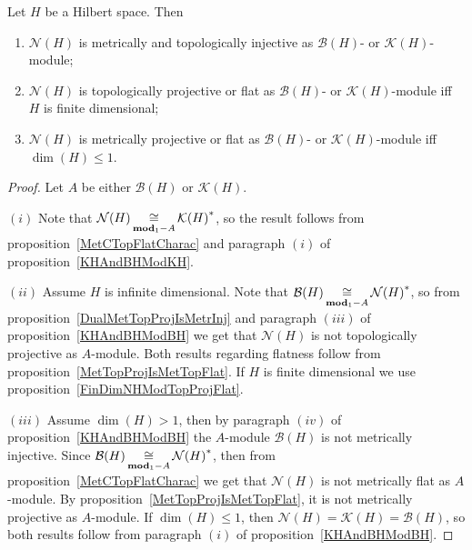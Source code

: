 \begin{proposition}\label{KHAndBHModNH} Let $H$ be a Hilbert space. Then

\begin{enumerate}[label = (\roman*)]
    \item $\mathcal{N}(H)$ is metrically and topologically injective as
    $\mathcal{B}(H)$- or $\mathcal{K}(H)$-module;

    \item $\mathcal{N}(H)$ is topologically projective or flat 
    as $\mathcal{B}(H)$- or $\mathcal{K}(H)$-module 
    iff $H$ is finite dimensional;

    \item $\mathcal{N}(H)$ is metrically projective or flat 
    as $\mathcal{B}(H)$- or $\mathcal{K}(H)$-module iff $\dim(H)\leq 1$.
\end{enumerate}
\end{proposition}
\begin{proof} Let $A$ be either $\mathcal{B}(H)$ or $\mathcal{K}(H)$.

$(i)$ Note that $\mathcal{N}(H)\mathop{\mathbin{\cong}}\limits_{\mathbf{mod}_1-A}{\mathcal{K}(H)}^*$, 
so the result follows from proposition~\ref{MetCTopFlatCharac} and 
paragraph $(i)$ of proposition~\ref{KHAndBHModKH}.

$(ii)$ Assume $H$ is infinite dimensional. Note that
$\mathcal{B}(H)\mathop{\mathbin{\cong}}\limits_{\mathbf{mod}_1-A}{\mathcal{N}(H)}^*$, so from
proposition~\ref{DualMetTopProjIsMetrInj} and paragraph $(iii)$ of
proposition~\ref{KHAndBHModBH} we get that $\mathcal{N}(H)$ is not topologically
projective as $A$-module. Both results regarding flatness follow from
proposition~\ref{MetTopProjIsMetTopFlat}. If $H$ is finite dimensional we use
proposition~\ref{FinDimNHModTopProjFlat}.

$(iii)$ Assume $\dim(H)>1$, then by paragraph $(iv)$ of
proposition~\ref{KHAndBHModBH} the $A$-module $\mathcal{B}(H)$ is not metrically
injective. Since $\mathcal{B}(H)\mathop{\mathbin{\cong}}\limits_{\mathbf{mod}_1-A}{\mathcal{N}(H)}^*$, then
from proposition~\ref{MetCTopFlatCharac} we get that $\mathcal{N}(H)$ is not
metrically flat as $A$-module. By proposition~\ref{MetTopProjIsMetTopFlat}, it
is not metrically projective as $A$-module. If $\dim(H)\leq 1$, then
$\mathcal{N}(H)=\mathcal{K}(H)=\mathcal{B}(H)$, so both results follow from
paragraph $(i)$ of proposition~\ref{KHAndBHModBH}.
\end{proof}

